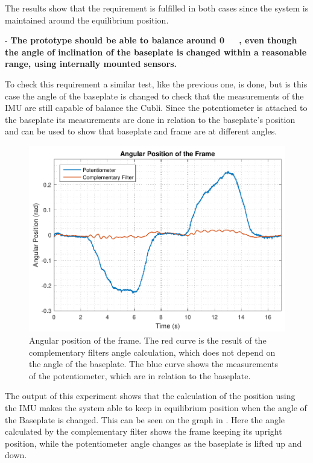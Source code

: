 The results show that the requirement is fulfilled in both cases since the system is maintained around the equilibrium position.

- \textbf{The prototype should be able to balance around \si{0\ \rad}, even though the angle of inclination of the baseplate is changed within a reasonable range, using internally mounted sensors.}

To check this requirement a similar test, like the previous one, is done, but is this case the angle of the baseplate is changed to check that the measurements of the IMU are still capable of balance the Cubli. Since the potentiometer is attached to the baseplate its measurements are done in relation to the baseplate's position and can be used to show that baseplate and frame are at different angles.

\begin{figure}[H]
	\centering
	\includegraphics[scale=0.62]{figures/testReq2}
	\caption{Angular position of the frame. The red curve is the result of the complementary filters angle calculation, which does not depend on the angle of the baseplate. The blue curve shows the measurements of the potentiometer, which are in relation to the baseplate.}
	\label{testReq2}
\end{figure}\vspace{-5mm}
%
The output of this experiment shows that the calculation of the position using the IMU makes the system able to keep in equilibrium position when the angle of the Baseplate is changed. This can be seen on the graph in . Here the angle calculated by the complementary filter shows the frame keeping its upright position, while the potentiometer angle changes as the baseplate is lifted up and down. 

